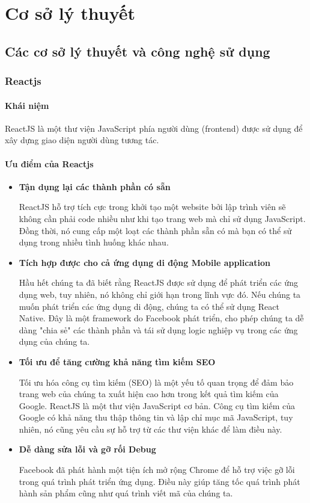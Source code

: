 \chapter{Cơ sở lý thuyết}
\section{Các cơ sở lý thuyết và công nghệ sử dụng}
\subsection{Reactjs}
\subsubsection{Khái niệm}
\indent ReactJS là một thư viện JavaScript phía người dùng (frontend) được sử dụng để xây dựng giao diện người dùng tương tác.
\subsubsection{Ưu điểm của Reactjs}
\begin{itemize}
    \item \textbf{Tận dụng lại các thành phần có sẵn}

    \indent ReactJS hỗ trợ tích cực trong khởi tạo một website bởi lập trình viên sẽ không cần phải code nhiều như khi tạo trang web mà chỉ sử dụng JavaScript. Đồng thời, nó cung cấp một loạt các thành phần sẵn có mà bạn có thể sử dụng trong nhiều tình huống khác nhau.
    \item \textbf{Tích hợp được cho cả ứng dụng di động Mobile application}

    \indent Hầu hết chúng ta đã biết rằng ReactJS được sử dụng để phát triển các ứng dụng web, tuy nhiên, nó không chỉ giới hạn trong lĩnh vực đó. Nếu chúng ta muốn phát triển các ứng dụng di động, chúng ta có thể sử dụng React Native. Đây là một framework do Facebook phát triển, cho phép chúng ta dễ dàng "chia sẻ" các thành phần và tái sử dụng logic nghiệp vụ trong các ứng dụng của chúng ta.
    \item \textbf{Tối ưu để tăng cường khả năng tìm kiếm SEO}

    \indent Tối ưu hóa công cụ tìm kiếm (SEO) là một yếu tố quan trọng để đảm bảo trang web của chúng ta xuất hiện cao hơn trong kết quả tìm kiếm của Google. ReactJS là một thư viện JavaScript cơ bản. Công cụ tìm kiếm của Google có khả năng thu thập thông tin và lập chỉ mục mã JavaScript, tuy nhiên, nó cũng yêu cầu sự hỗ trợ từ các thư viện khác để làm điều này.
    \item \textbf{Dễ dàng sửa lỗi và gỡ rối Debug}

    \indent Facebook đã phát hành một tiện ích mở rộng Chrome để hỗ trợ việc gỡ lỗi trong quá trình phát triển ứng dụng. Điều này giúp tăng tốc quá trình phát hành sản phẩm cũng như quá trình viết mã của chúng ta.
\end{itemize}
